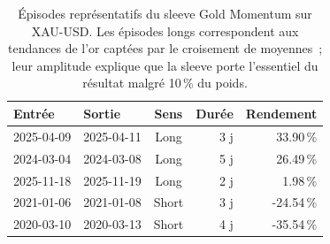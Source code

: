 \begin{table}[H]
\centering
\caption{Épisodes représentatifs du sleeve Gold Momentum sur XAU-USD. Les épisodes longs correspondent aux tendances de l'or captées par le croisement de moyennes~; leur amplitude explique que la sleeve porte l'essentiel du résultat malgré 10\,\% du poids.}
\label{tab:trades_gold_momentum}
\begin{tabular}{llcrr}
\toprule
Entrée & Sortie & Sens & Durée & Rendement \\
\midrule
2025-04-09 & 2025-04-11 & Long & 3 j & 33.90\,\% \\
2024-03-04 & 2024-03-08 & Long & 5 j & 26.49\,\% \\
2025-11-18 & 2025-11-19 & Long & 2 j & 1.98\,\% \\
2021-01-06 & 2021-01-08 & Short & 3 j & -24.54\,\% \\
2020-03-10 & 2020-03-13 & Short & 4 j & -35.54\,\% \\
\bottomrule
\end{tabular}
\end{table}
